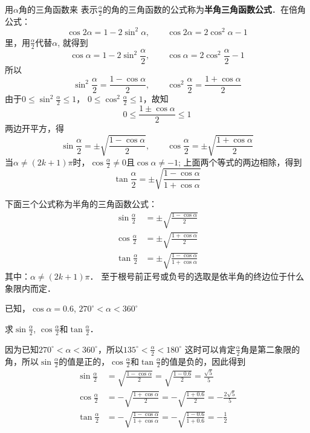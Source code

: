 用$\alpha$角的三角函数来
表示$\frac{\alpha}{2}$的角的三角函数的公式称为\textbf{半角三角函数公式}．在倍角公式：
\[\cos2\alpha=1-2\sin^2\alpha,\qquad \cos2\alpha=2\cos^2\alpha-1\]
里，用$\frac{\alpha}{2}$代替$\alpha$, 就得到
\[\cos\alpha=1-2\sin^2\frac{\alpha}{2},\qquad \cos\alpha=2\cos^2\frac{\alpha}{2}-1\]
所以
\[\sin^2\frac{\alpha}{2}=\frac{1-\cos\alpha}{2},\qquad \cos^2\frac{\alpha}{2}=\frac{1+\cos\alpha}{2}\]
由于$0\le \sin^2 \frac{\alpha}{2}\le 1$，
$0\le \cos^2\frac{\alpha}{2}\le 1$，故知
\[0\le \frac{1\pm\cos\alpha}{2}\le 1\]
两边开平方，得
\[\sin\frac{\alpha}{2}=\pm\sqrt{\frac{1-\cos\alpha}{2}},\qquad \cos\frac{\alpha}{2}=\pm\sqrt{\frac{1+\cos\alpha}{2}}\]
当$\alpha\ne(2k+1)\pi$时，$\cos\frac{\alpha}{2}\ne 0$且$\cos\alpha\ne -1$; 上面两个等式的两边相除，得到
\[\tan\frac{\alpha}{2}=\pm\sqrt{\frac{1-\cos\alpha}{1+\cos\alpha}}\]

下面三个公式称为半角的三角函数公式：
\begin{align}
    \sin\frac{\alpha}{2}&=\pm\sqrt{\frac{1-\cos\alpha}{2}}\\
     \cos\frac{\alpha}{2}&=\pm\sqrt{\frac{1+\cos\alpha}{2}}\\
     \tan\frac{\alpha}{2}&=\pm\sqrt{\frac{1-\cos\alpha}{1+\cos\alpha}}
\end{align}
其中：$\alpha\ne (2k+1)\pi$．
至于根号前正号或负号的选取是依半角的终边位于什么象限内而定．

\begin{example}
已知，$\cos\alpha=0.6$, $270^{\circ}<\alpha<360^{\circ}$

求$\sin \frac{\alpha}{2}$, $\cos\frac{\alpha}{2}$和$\tan \frac{\alpha}{2}$．
\end{example}

\begin{solution}
因为已知$270^{\circ}<\alpha<360^{\circ}$，所以$135^{\circ}<\frac{\alpha}{2}<180^{\circ}$
这时可以肯定$\frac{\alpha}{2}$角是第二象限的角，所以$\sin \frac{\alpha}{2}$的值是正的，$\cos\frac{\alpha}{2}$和$\tan \frac{\alpha}{2}$的值是负的，因此得到
\[\begin{split}
    \sin\frac{\alpha}{2}&=\sqrt{\frac{1-\cos\alpha}{2}}=\sqrt{\frac{1-0.6}{2}}=\frac{\sqrt{5}}{5}\\
     \cos\frac{\alpha}{2}&=-\sqrt{\frac{1+\cos\alpha}{2}}=-\sqrt{\frac{1+0.6}{2}}=-\frac{2\sqrt{5}}{5}\\
     \tan\frac{\alpha}{2}&=-\sqrt{\frac{1-\cos\alpha}{1+\cos\alpha}}=-\sqrt{\frac{1-0.6}{1+0.6}}=-\frac{1}{2}
\end{split}\]
\end{solution}

